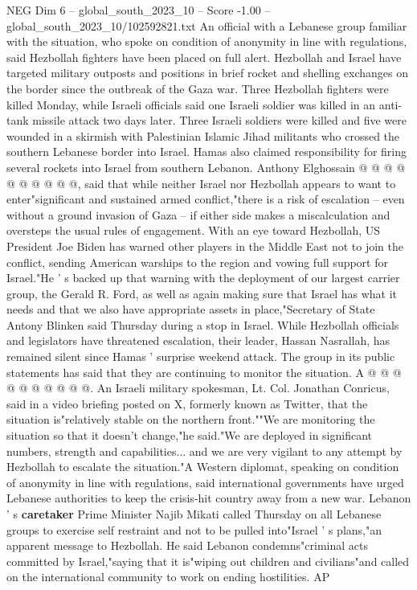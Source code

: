 \begin{textsample}{NEG Dim 6 – global\_south\_2023\_10 – Score -1.00 – global\_south\_2023\_10/102592821.txt}
An official with a Lebanese group familiar with the situation, who spoke on condition of anonymity in line with regulations, said Hezbollah fighters have been placed on full alert.
Hezbollah and Israel have targeted military outposts and positions in brief rocket and shelling exchanges on the border since the outbreak of the Gaza war.
Three Hezbollah fighters were killed Monday, while Israeli officials said one Israeli soldier was killed in an anti-tank missile attack two days later.
Three Israeli soldiers were killed and five were wounded in a skirmish with Palestinian Islamic Jihad militants who crossed the southern Lebanese border into Israel.
Hamas also claimed responsibility for firing several rockets into Israel from southern Lebanon.
Anthony Elghossain @ @ @ @ @ @ @ @ @ @, said that while neither Israel nor Hezbollah appears to want to enter"significant and sustained armed conflict,"there is a risk of escalation -- even without a ground invasion of Gaza -- if either side makes a miscalculation and oversteps the usual rules of engagement.
With an eye toward Hezbollah, US President Joe Biden has warned other players in the Middle East not to join the conflict, sending American warships to the region and vowing full support for Israel."He ' s backed up that warning with the deployment of our largest carrier group, the Gerald R.
Ford, as well as again making sure that Israel has what it needs and that we also have appropriate assets in place,"Secretary of State Antony Blinken said Thursday during a stop in Israel.
While Hezbollah officials and legislators have threatened escalation, their leader, Hassan Nasrallah, has remained silent since Hamas ' surprise weekend attack.
The group in its public statements has said that they are continuing to monitor the situation.
A @ @ @ @ @ @ @ @ @ @.
An Israeli military spokesman, Lt.
Col.
Jonathan Conricus, said in a video briefing posted on X, formerly known as Twitter, that the situation is"relatively stable on the northern front.""We are monitoring the situation so that it doesn't change,"he said."We are deployed in significant numbers, strength and capabilities... and we are very vigilant to any attempt by Hezbollah to escalate the situation."A Western diplomat, speaking on condition of anonymity in line with regulations, said international governments have urged Lebanese authorities to keep the crisis-hit country away from a new war.
Lebanon ' s \textbf{caretaker} Prime Minister Najib Mikati called Thursday on all Lebanese groups to exercise self restraint and not to be pulled into"Israel ' s plans,"an apparent message to Hezbollah.
He said Lebanon condemns"criminal acts committed by Israel,"saying that it is"wiping out children and civilians"and called on the international community to work on ending hostilities.
AP

\end{textsample}
